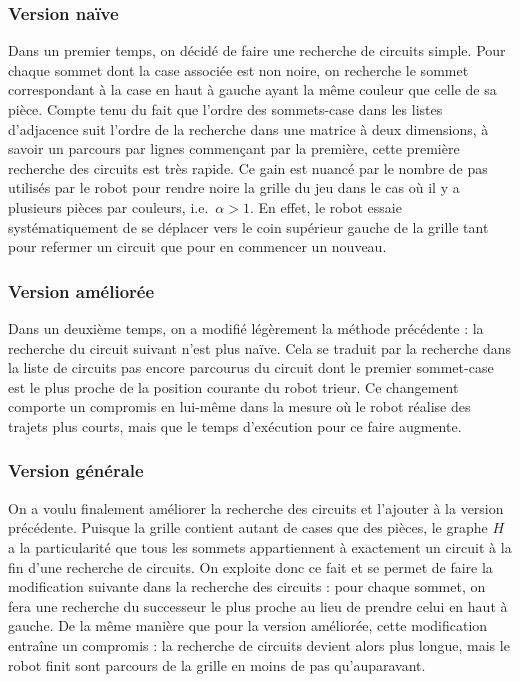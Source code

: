 \documentclass[12pt,a4paper]{article}
\begin{document}
\subsubsection*{Version na\"ive}
Dans un premier temps, on d\'ecid\'e de faire une recherche de circuits simple. Pour chaque sommet dont la case associ\'ee est non noire, on recherche le sommet correspondant \`a la case en haut \`a gauche ayant la m\^eme couleur que celle de sa pi\`ece. Compte tenu du fait que l'ordre des sommets-case dans les listes d'adjacence suit l'ordre de la recherche dans une matrice \`a deux dimensions, \`a savoir un parcours par lignes commen\c{c}ant par la premi\`ere, cette premi\`ere recherche des circuits est tr\`es rapide. Ce gain est nuanc\'e par le nombre de pas utilis\'es par le robot pour rendre noire la grille du jeu dans le cas o\`u il y a plusieurs pi\`eces par couleurs, i.e.\ $\alpha > 1$. En effet, le robot essaie syst\'ematiquement de se d\'eplacer vers le coin sup\'erieur gauche de la grille tant pour refermer un circuit que pour en commencer un nouveau.

\subsubsection*{Version am\'elior\'ee}
Dans un deuxi\`eme temps, on a modifi\'e l\'eg\`erement la m\'ethode pr\'ec\'edente : la recherche du circuit suivant n'est plus na\"ive. Cela se traduit par la recherche dans la liste de circuits pas encore parcourus du circuit dont le premier sommet-case est le plus proche de la position courante du robot trieur. Ce changement comporte un compromis en lui-m\^eme dans la mesure o\`u le robot r\'ealise des trajets plus courts, mais que le temps d'ex\'ecution pour ce faire augmente.

\subsubsection*{Version g\'en\'erale}
On a voulu finalement am\'eliorer la recherche des circuits et l'ajouter \`a la version pr\'ec\'edente. Puisque la grille contient autant de cases que des pi\`eces, le graphe $H$ a la particularit\'e que tous les sommets appartiennent \`a exactement un circuit \`a la fin d'une recherche de circuits. On exploite donc ce fait et se permet de faire la modification suivante dans la recherche des circuits : pour chaque sommet, on fera une recherche du successeur le plus proche au lieu de prendre celui en haut \`a gauche. De la m\^eme mani\`ere que pour la version am\'elior\'ee, cette modification entra\^ine un compromis : la recherche de circuits devient alors plus longue, mais le robot finit sont parcours de la grille en moins de pas qu'auparavant.
\end{document}
